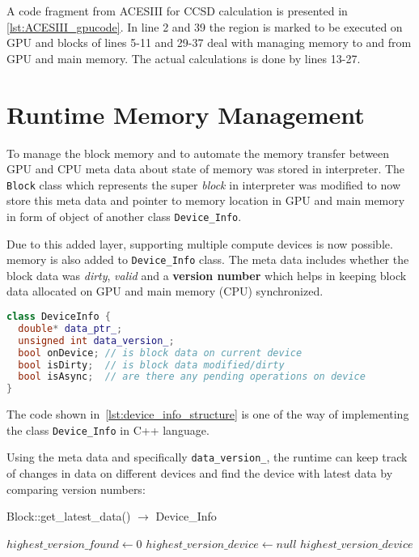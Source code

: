 A code fragment from ACESIII for CCSD calculation is presented in
\ref{lst:ACESIII_gpucode}. In line 2 and 39 the region is marked to be executed
on GPU and blocks of lines 5-11 and 29-37 deal with managing memory to and from
GPU and main memory. The actual calculations is done by lines 13-27.

\section{Runtime Memory Management}
To manage the block memory and to automate the memory transfer between GPU and CPU
meta data about state of memory was stored in interpreter. The \texttt{Block} class
which represents the super \textit{block} in interpreter was modified to now store
this meta data and pointer to memory location in GPU and main memory in form of
object of another class \texttt{Device\_Info}.

Due to this added layer, supporting multiple compute devices is now possible.
memory is also added to \texttt{Device\_Info} class. The meta data includes whether
the block data was \textit{dirty}, \textit{valid} and a \textbf{version number}
which helps in keeping block data allocated on GPU and main memory (CPU)
synchronized.

\begin{lstlisting}[caption={\texttt{Device\_Info} Class structure},
  language=C++,
  label={lst:device_info_structure}]
class DeviceInfo {
  double* data_ptr_;
  unsigned int data_version_;
  bool onDevice; // is block data on current device
  bool isDirty;  // is block data modified/dirty
  bool isAsync;  // are there any pending operations on device
}
\end{lstlisting}

The code shown in~\ref{lst:device_info_structure} is one of the way of implementing
the class \texttt{Device\_Info} in C++ language.

Using the meta data and specifically \texttt{data\_version\_}, the runtime can keep
track of changes in data on different devices and find the device with latest
data by comparing version numbers:

\begin{algorithm}  {Block::get\_latest\_data() $\rightarrow$ Device\_Info}
  \singlespacing

  \begin{algorithmic}[1]
    \State $highest\_version\_found \gets 0$
    \State $highest\_version\_device \gets null$
    \EndIf
    \EndFor
    \State \Return $highest\_version\_device$
    \EndFunction
  \end{algorithmic}
\end{algorithm}

